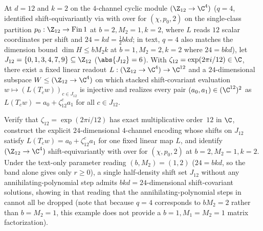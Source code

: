 \begin{example}[Shift-covariant $4$-channel band witness at $d = 12$ over $\C$]\label{ex:d12-band}
At $d = 12$ and $k = 2$ on the $4$-channel cyclic module $(\Z_{12} \to \C^4)$ ($q = 4$, identified
shift-equivariantly via  with
 over  for
$(\chi, p_0, 2)$ on the single-class partition $p_0 : \Z_{12} \to \mathrm{Fin}\,1$ at
$b = 2, M_2 = 1, k = 2$, where $L$ reads $12$ scalar coordinates per shift and $24 = kd = \frac{1}{2}bkd$;
in text, $q = 4$ also matches the dimension bound $\dim H \le b M_2 k$ at $b = 1, M_2 = 2, k = 2$
where $24 = bkd$), let $J_{12} = \{0, 1, 3, 4, 7, 9\} \subseteq \Z_{12}$ ($\abs{J_{12}} = 6$). With
$\zeta_{12} = \exp(2\pi i / 12) \in \C$, there exist a fixed linear readout
$L : (\Z_{12} \to \C^4) \to \C^{12}$ and a $24$-dimensional subspace $W \le (\Z_{12} \to \C^4)$ on
which stacked shift-covariant evaluation $w \mapsto (L(T_c w))_{c \in J_{12}}$ is injective and
realizes every pair $(a_0, a_1) \in (\C^{12})^2$ as $L(T_c w) = a_0 + \zeta_{12}^c a_1$ for all
$c \in J_{12}$.
\end{example}
\begin{outline}
Verify that $\zeta_{12} = \exp(2\pi i / 12)$ has exact multiplicative order~$12$ in $\C$, construct
the explicit $24$-dimensional $4$-channel encoding whose shifts on $J_{12}$ satisfy
$L(T_c w) = a_0 + \zeta_{12}^c a_1$ for one fixed linear map $L$, and identify $(\Z_{12} \to \C^4)$
shift-equivariantly with  over
 for $(\chi, p_0, 2)$ at $b = 2, M_2 = 1, k = 2$. Under the
text-only parameter reading $(b, M_2) = (1, 2)$ ($24 = bkd$, so the band alone gives only $r \ge 0$),
a single half-density shift set $J_{12}$ without any annihilating-polynomial step admits
$bkd = 24$-dimensional shift-covariant solutions, showing in that reading that the
annihilating-polynomial steps in  cannot all be dropped
(note that because $q = 4$ corresponds to $b M_2 = 2$ rather than $b = M_2 = 1$, this example does not
provide a $b = 1, M_1 = M_2 = 1$ matrix factorization).
\end{outline}
